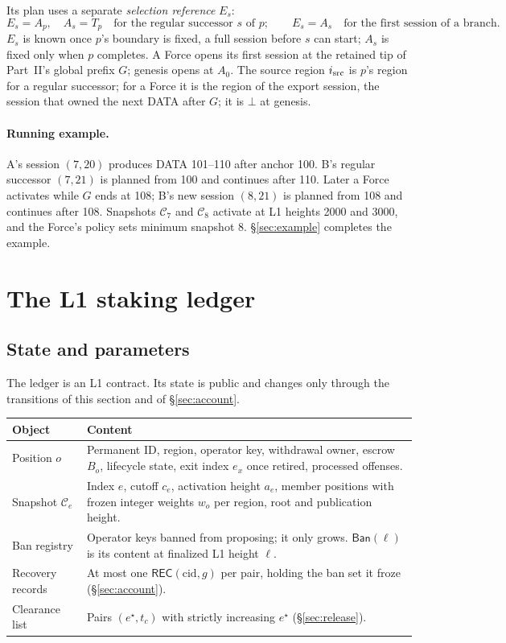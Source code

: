 \documentclass[11pt,a4paper]{article}
\newcommand{\tagg}[1]{\mathsf{#1}}
\newcommand{\cfg}{\mathcal C}
\newcommand{\Ban}{\mathsf{Ban}}
\newcommand{\cid}{\mathrm{cid}}
\begin{document}
Its plan uses a separate \emph{selection reference} $E_s$:
\[
 E_s=A_p,\quad A_s=T_p\quad\text{for the regular successor $s$ of $p$};
 \qquad E_s=A_s\quad\text{for the first session of a branch.}
\]
$E_s$ is known once $p$'s boundary is fixed, a full session before $s$
can start; $A_s$ is fixed only when $p$ completes. A Force opens its
first session at the retained tip of Part~II's global prefix $G$; genesis
opens at $A_0$. The source region $i_{\rm src}$ is $p$'s region for a
regular successor; for a Force it is the region of the export session,
the session that owned the next DATA after $G$; it is $\bot$ at genesis.

\paragraph{Running example.}
A's session $(7,20)$ produces DATA 101--110 after anchor 100. B's regular
successor $(7,21)$ is planned from 100 and continues after 110. Later a
Force activates while $G$ ends at 108; B's new session $(8,21)$ is planned
from 108 and continues after 108. Snapshots $\cfg_7$ and $\cfg_8$ activate
at L1 heights 2000 and 3000, and the Force's policy sets minimum snapshot
8. \S\ref{sec:example} completes the example.

\section{The L1 staking ledger}
\label{sec:ledger}
\subsection{State and parameters}
The ledger is an L1 contract. Its state is public and changes only
through the transitions of this section and of \S\ref{sec:account}.

\begin{tabularx}{\linewidth}{@{}>{\raggedright\arraybackslash}p{.20\linewidth}Y@{}}\toprule
Object & Content\\\midrule
Position $o$ & Permanent ID, region, operator key, withdrawal owner,
escrow $B_o$, lifecycle state, exit index $e_x$ once retired, processed
offenses.\\
Snapshot $\cfg_e$ & Index $e$, cutoff $c_e$, activation height $a_e$,
member positions with frozen integer weights $w_o$ per region, root and
publication height.\\
Ban registry & Operator keys banned from proposing; it only grows.
$\Ban(\ell)$ is its content at finalized L1 height $\ell$.\\
Recovery records & At most one $\tagg{REC}(\cid,g)$ per pair, holding the
ban set it froze (\S\ref{sec:account}).\\
Clearance list & Pairs $(e^\star,t_c)$ with strictly increasing
$e^\star$ (\S\ref{sec:release}).\\\bottomrule
\end{tabularx}
\end{document}
